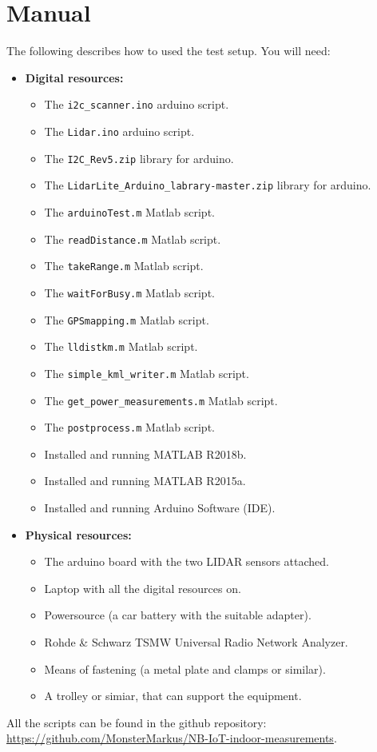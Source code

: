 \documentclass[a4paper,twoside, 12pt]{article}
\begin{document}
\section{Manual}
The following describes how to used the test setup. You will need:
\begin{itemize}
	\item \textbf{Digital resources:}
	\begin{itemize}
		\item The \texttt{i2c\_scanner.ino} arduino script.
		\item The \texttt{Lidar.ino} arduino script.
		\item The \texttt{I2C\_Rev5.zip} library for arduino.
		\item The \texttt{LidarLite\_Arduino\_labrary-master.zip} library for arduino.
		\item The \texttt{arduinoTest.m} Matlab script.
		\item The \texttt{readDistance.m} Matlab script.
		\item The \texttt{takeRange.m} Matlab script.
		\item The \texttt{waitForBusy.m} Matlab script.
		\item The \texttt{GPSmapping.m} Matlab script.
		\item The \texttt{lldistkm.m} Matlab script.
		\item The \texttt{simple\_kml\_writer.m} Matlab script.
		\item The \texttt{get\_power\_measurements.m} Matlab script.
		\item The \texttt{postprocess.m} Matlab script.
		\item Installed and running MATLAB R2018b.
		\item Installed and running MATLAB R2015a.
		\item Installed and running Arduino Software (IDE).
	\end{itemize}
	\item \textbf{Physical resources:}
	\begin{itemize}
		\item The arduino board with the two LIDAR sensors attached. 
		\item Laptop with all the digital resources on.
		\item Powersource (a car battery with the suitable adapter).
		\item Rohde \& Schwarz TSMW Universal Radio Network Analyzer.
		\item Means of fastening (a metal plate and clamps or similar).
		\item A trolley or simiar, that can support the equipment.
	\end{itemize}
\end{itemize}
All the scripts can be found in the github repository: \\
\url{https://github.com/MonsterMarkus/NB-IoT-indoor-measurements}.
\end{document}
